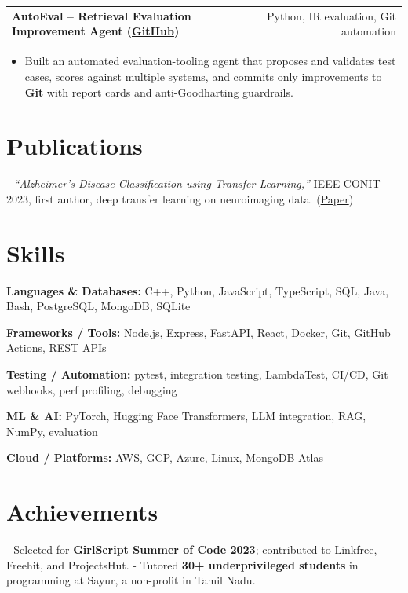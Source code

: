\documentclass[letterpaper,11pt]{article}
\makeatletter
\newcommand{\projItem}[2]{%
  \vspace{6pt}
  \begin{tabular*}{\textwidth}{@{}l@{\extracolsep{\fill}}r@{}}
    \textbf{#1} & #2 \\
  \end{tabular*}\par\vspace{-2pt}
}
\newcommand{\skillLine}[2]{\textbf{#1:} #2\par\vspace{2pt}}
\newcommand{\inlineBlock}[1]{{\setlength{\leftskip}{0.18in}\small #1\par}}
\makeatother
\begin{document}
\projItem{AutoEval -- Retrieval Evaluation Improvement Agent {\normalfont\small(\href{https://github.com/Deva-1903/AutoEval}{GitHub})}}{Python, IR evaluation, Git automation}
\begin{itemize}
  \item Built an automated evaluation-tooling agent that proposes and validates test cases, scores against multiple systems, and commits only improvements to \textbf{Git} with report cards and anti-Goodharting guardrails.
\end{itemize}

\section{Publications}
\inlineBlock{- \textit{``Alzheimer's Disease Classification using Transfer Learning,''} IEEE CONIT 2023, first author, deep transfer learning on neuroimaging data. {\normalfont\small(\href{https://ieeexplore.ieee.org/document/10205760}{Paper})}}

\section{Skills}
\skillLine{Languages \& Databases}{C++, Python, JavaScript, TypeScript, SQL, Java, Bash, PostgreSQL, MongoDB, SQLite}
\skillLine{Frameworks / Tools}{Node.js, Express, FastAPI, React, Docker, Git, GitHub Actions, REST APIs}
\skillLine{Testing / Automation}{pytest, integration testing, LambdaTest, CI/CD, Git webhooks, perf profiling, debugging}
\skillLine{ML \& AI}{PyTorch, Hugging Face Transformers, LLM integration, RAG, NumPy, evaluation}
\skillLine{Cloud / Platforms}{AWS, GCP, Azure, Linux, MongoDB Atlas}

\section{Achievements}
\inlineBlock{- Selected for \textbf{GirlScript Summer of Code 2023}; contributed to Linkfree, Freehit, and ProjectsHut. - Tutored \textbf{30+ underprivileged students} in programming at Sayur, a non-profit in Tamil Nadu.}
\end{document}
